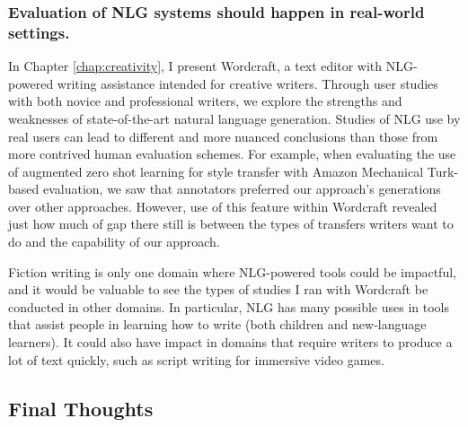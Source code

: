 \subsubsection{Evaluation of NLG systems should happen in real-world settings.}
	In Chapter \ref{chap:creativity}, I present Wordcraft, a text editor with NLG-powered writing assistance intended for creative writers.
	Through user studies with both novice and professional writers, we explore the strengths and weaknesses of state-of-the-art natural language generation.
	Studies of NLG use by real users can lead to different and more nuanced conclusions than those from more contrived human evaluation schemes.
	For example, when evaluating the use of augmented zero shot learning for style transfer with Amazon Mechanical Turk-based evaluation, we saw that annotators preferred our approach's generations over other approaches.
	However, use of this feature within Wordcraft revealed just how much of gap there still is between the types of transfers writers want to do and the capability of our approach.

	Fiction writing is only one domain where NLG-powered tools could be impactful, and it would be valuable to see the types of studies I ran with Wordcraft be conducted in other domains.
	In particular, NLG has many possible uses in tools that assist people in learning how to write (both children and new-language learners).
	It could also have impact in domains that require writers to produce a lot of text quickly, such as script writing for immersive video games.

\subsection{Final Thoughts}

